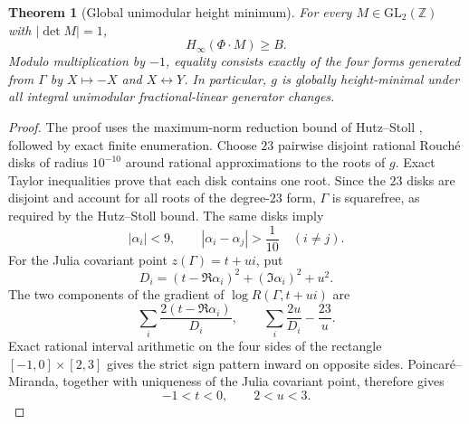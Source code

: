 \documentclass[11pt]{article}
\newtheorem{theorem}{Theorem}[section]
\begin{document}
\begin{theorem}[Global unimodular height minimum]\label{thm:sl2-height-global}
For every $M\in\mathrm{GL}_2(\mathbb Z)$ with $|\det M|=1$,
\[
 H_\infty(\Phi\mathbin{\cdot}M)\ge B.
\]
Modulo multiplication by $-1$, equality consists exactly of the four forms generated from $\Gamma$ by $X\mapsto-X$ and $X\leftrightarrow Y$.  In particular, $g$ is globally height-minimal under all integral unimodular fractional-linear generator changes.
\end{theorem}

\begin{proof}
The proof uses the maximum-norm reduction bound of Hutz--Stoll \cite[Theorem~4.7 and Remark~4.9]{HutzStoll2019}, followed by exact finite enumeration.  Choose $23$ pairwise disjoint rational Rouch\'e disks of radius $10^{-10}$ around rational approximations to the roots of $g$.  Exact Taylor inequalities prove that each disk contains one root.  Since the $23$ disks are disjoint and account for all roots of the degree-$23$ form, $\Gamma$ is squarefree, as required by the Hutz--Stoll bound.  The same disks imply
\[
 |\alpha_i|<9,\qquad |\alpha_i-\alpha_j|>\frac1{10}\quad(i\ne j).
\]
For the Julia covariant point $z(\Gamma)=t+ui$, put
\[
 D_i=(t-\Re\alpha_i)^2+(\Im\alpha_i)^2+u^2.
\]
The two components of the gradient of $\log R(\Gamma,t+ui)$ are
\[
 \sum_i\frac{2(t-\Re\alpha_i)}{D_i},\qquad
 \sum_i\frac{2u}{D_i}-\frac{23}{u}.
\]
Exact rational interval arithmetic on the four sides of the rectangle $[-1,0]\times[2,3]$ gives the strict sign pattern inward on opposite sides.  Poincar\'e--Miranda, together with uniqueness of the Julia covariant point, therefore gives
\[
 -1<t<0,\qquad 2<u<3.
\]


\end{proof}
\end{document}
